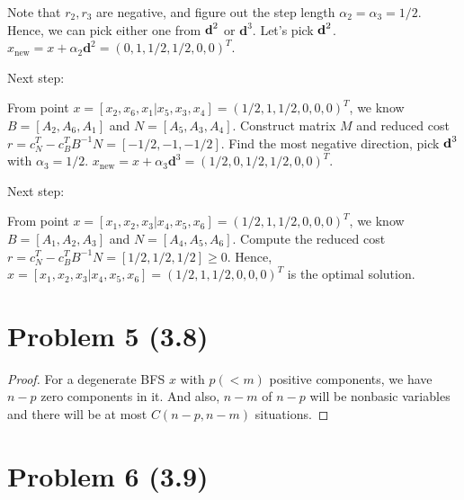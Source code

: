 \documentclass[12pt]{article}
\begin{document}
Note that $r_2, r_3$ are negative, and figure out the step length $\alpha_2 = \alpha_3 = 1/2$. Hence, we can pick either one from $\textbf d^2$ or $\textbf{d}^3$. Let's pick $\textbf d^2$. $x_{\text{new}} = x + \alpha_2\textbf{d}^2 = (0,1,1/2,1/2,0,0)^T$. 

Next step:

From point $x = [x_2, x_6, x_1 | x_5, x_3, x_4] = (1/2,1,1/2,0,0,0)^T$, we know $B = [A_2, A_6, A_1]$ and $N = [A_5, A_3, A_4]$. Construct matrix $M$ and reduced cost $r = c_N^T - c_B^TB^{-1}N = [-1/2, -1, -1/2]$. Find the most negative direction, pick $\textbf d^3$ with $\alpha_3 = 1/2$. $x_{\text{new}} = x + \alpha_3\textbf{d}^3 =  (1/2,0,1/2,1/2,0,0)^T$.

Next step:

From point $x = [x_1, x_2, x_3 | x_4, x_5, x_6] = (1/2,1,1/2,0,0,0)^T$, we know $B = [A_1, A_2, A_3]$ and $N = [A_4, A_5, A_6]$. Compute the reduced cost $r = c_N^T - c_B^TB^{-1}N = [1/2, 1/2, 1/2]  \geqslant 0$. Hence, $x = [x_1, x_2, x_3 | x_4, x_5, x_6] = (1/2,1,1/2,0,0,0)^T$ is the optimal solution.



\section*{Problem 5 (3.8)}

\begin{proof}

For a degenerate BFS $x$ with $p(<m)$ positive components, we have $n-p$ zero components in it. And also, $n-m$ of $n-p$ will be nonbasic variables and there will be at most $C(n-p, n-m)$ situations. 

\end{proof}


\section*{Problem 6 (3.9)}
\end{document}

